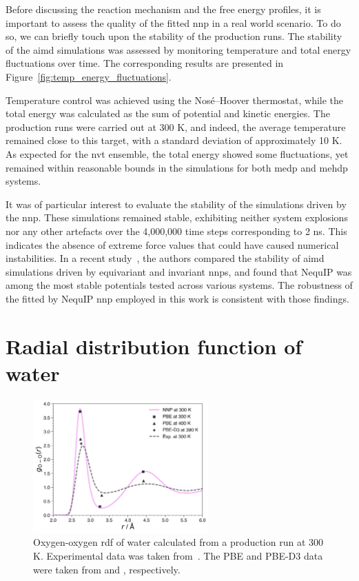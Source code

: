 Before discussing the reaction mechanism and the free energy profiles, it is important to assess the quality of the fitted \ac{nnp} in a real world scenario. To do so, we can briefly touch upon the stability of the production runs. The stability of the \ac{aimd} simulations was assessed by monitoring temperature and total energy fluctuations over time. The corresponding results are presented in Figure~\ref{fig:temp_energy_fluctuations}.

Temperature control was achieved using the Nos\'e--Hoover thermostat, while the total energy was calculated as the sum of potential and kinetic energies. The production runs were carried out at 300 K, and indeed, the average temperature remained close to this target, with a standard deviation of approximately 10 K. As expected for the \ac{nvt} ensemble, the total energy showed some fluctuations, yet remained within reasonable bounds in the simulations for both \ac{medp} and \ac{mehdp} systems.

It was of particular interest to evaluate the stability of the simulations driven by the \ac{nnp}. These simulations remained stable, exhibiting neither system explosions nor any other artefacts over the 4,000,000 time steps corresponding to 2 ns. This indicates the absence of extreme force values that could have caused numerical instabilities. In a recent study~\citep{fuForcesAreNot2023}, the authors compared the stability of \ac{aimd} simulations driven by equivariant and invariant \acp{nnp}, and found that NequIP was among the most stable potentials tested across various systems. The robustness of the fitted by NequIP \ac{nnp} employed in this work is consistent with those findings.



\section{Radial distribution function of water} \label{sec:water_rdf}

\begin{figure}[b!]
    \centering
    \includegraphics[width=0.6\textwidth]{Figures/4_Results/results_water_rdf.png}
    \caption{Oxygen-oxygen \ac{rdf} of water calculated from a production run at 300 K. Experimental data was taken from~\citep{soperRadialDistributionFunctions2013}. The PBE and PBE-D3 data were taken from \citep{phamStructureDynamicsAqueous2016} and \citep{zhouQuantifyingStructureWater2022}, respectively.}
    \label{fig:water_rdf}
\end{figure}


